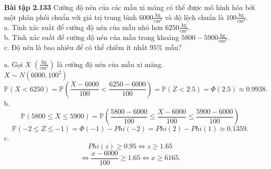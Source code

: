 \documentclass[12pt,a4paper]{article}
\begin{document}
\begin{mybox}
\textbf{Bài tập 2.133} Cường độ nén của các mẫu xi măng có thể được mô hình hóa bởi một phân phối chuẩn với giá trị trung bình $6000 \mathrm{\frac{kg}{cm^2}}$ và độ lệch chuẩn là $100 \mathrm{\frac{kg}{cm^2}}.$\\
a. Tính xác suất để cường độ nén của mẫu nhỏ hơn $6250 \mathrm{\frac{kg}{cm^2}}.$\\
b. Tính xác suất để cường độ nén của mẫu trong khoảng $5800 - 5900 \mathrm{\frac{kg}{cm^2}}.$\\
c. Độ nén là bao nhiêu để có thể chiếm ít nhất $95 \%$ mẫu?
\end{mybox}
a. Gọi $X$ $\left( {\mathrm{\frac{kg}{cm^2}}} \right)$ là cường độ nén của mẫu xi măng.\\
$X \sim N \left( {6000, 100^2} \right)$
$$\mathbb{P} \left( {X < 6250} \right) = \mathbb{P} \left( {\frac{X - 6000}{100} < \frac{6250 - 6000}{100}} \right) = \mathbb{P} \left( {Z < 2.5} \right) = \Phi \left( {2.5} \right) \approx 0.9938.$$
b. $$\mathbb{P} \left( {5800 \leqslant X \leqslant 5900} \right) = \mathbb{P} \left( {\frac{5800 - 6000}{100} \leqslant  \frac{X - 6000}{100} \leqslant \frac{5900 - 6000}{100}} \right)$$
$$\mathbb{P} \left( {-2 \leqslant Z \leqslant -1} \right) = \Phi \left( {-1} \right) - Phi \left( {-2} \right) = Phi \left( 2 \right) - Phi \left( 1 \right) \approx 0.1359.$$
c. $$Phi \left( z \right) \geqslant 0.95 \Leftrightarrow z \geqslant 1.65$$
$$\Leftrightarrow \frac{x - 6000}{100} \geqslant 1.65 \Leftrightarrow x \geqslant 6165.$$ 
\end{document}
